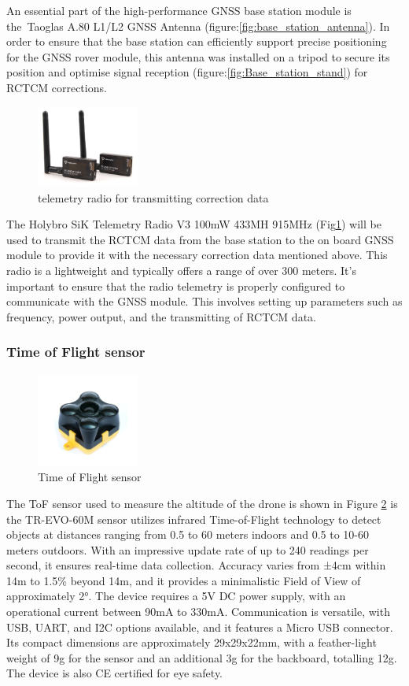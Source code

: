 \documentclass{article}
\begin{document}
An essential part of the high-performance GNSS base station module is the Taoglas A.80 L1/L2 GNSS Antenna (figure:\ref{fig:base_station_antenna}). In order to ensure that the base station can efficiently support precise positioning for the GNSS rover module, this antenna was installed on a tripod to secure its position and optimise signal reception (figure:\ref{fig:Base_station_stand}) for RCTCM corrections. 
\begin{figure}[H]
  \centering
  \includegraphics[width=0.3\textwidth]{Pictures/telemetry radio.png}
  \caption{telemetry radio for transmitting correction data}
  \label{fig:telemetry_radio}
\end{figure}
The Holybro SiK Telemetry Radio V3 100mW 433MH 915MHz (Fig\ref{fig:telemetry_radio}) will be used to transmit the RCTCM data from the base station to the on board GNSS module to provide it with the necessary correction data mentioned above. This radio is a lightweight and typically offers a range of over 300 meters. 
It's important to ensure that the radio telemetry is properly configured to communicate with the GNSS module. This involves setting up parameters such as frequency, power output, and the transmitting of RCTCM data.

\subsubsection{Time of Flight sensor}
\begin{figure}[H]
  \centering
  \includegraphics[width=0.3\textwidth]{Pictures/ToF_sensor.png}
  \caption{Time of Flight sensor}
  \label{fig:ToF}
\end{figure}
The ToF sensor used to measure the altitude of the drone is shown in Figure \ref{fig:ToF} is the TR-EVO-60M sensor utilizes infrared Time-of-Flight technology to detect objects at distances ranging from 0.5 to 60 meters indoors and 0.5 to 10-60 meters outdoors. With an impressive update rate of up to 240 readings per second, it ensures real-time data collection. Accuracy varies from ±4cm within 14m to 1.5\%
beyond 14m, and it provides a minimalistic Field of View of approximately 2°. The device requires a 5V DC power supply, with an operational current between 90mA to 330mA. Communication is versatile, with USB, UART, and I2C options available, and it features a Micro USB connector. Its compact dimensions are approximately 29x29x22mm, with a feather-light weight of 9g for the sensor and an additional 3g for 
the backboard, totalling 12g. The device is also CE certified for eye safety.
\end{document}
